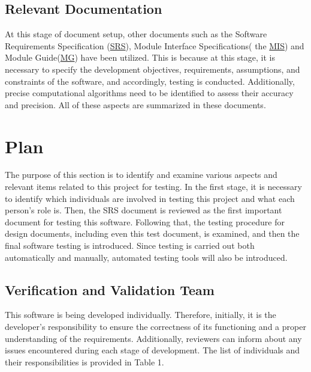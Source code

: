 \documentclass[12pt, titlepage]{article}
\begin{document}
\subsection{Relevant Documentation}

At this stage of document setup, other documents such as the Software Requirements Specification (\href{https://github.com/AtiyehSayadi/Centrality-In-Graphs/blob/main/docs/SRS/SRS.pdf}{SRS}), Module Interface Specifications( the \href{https://github.com/AtiyehSayadi/Centrality-In-Graphs/blob/main/docs/Design/SoftDetailedDes/MIS.pdf}{MIS}) and Module Guide(\href{https://github.com/AtiyehSayadi/Centrality-In-Graphs/blob/main/docs/Design/SoftArchitecture/MG.pdf}{MG}) have been utilized. This is because at this stage, it is necessary to specify the development objectives, requirements, assumptions, and constraints of the software, and accordingly, testing is conducted. Additionally, precise computational algorithms need to be identified to assess their accuracy and precision. All of these aspects are summarized in these documents.


\section{Plan}
The purpose of this section is to identify and examine various aspects and relevant items related to this project for testing. In the first stage, it is necessary to identify which individuals are involved in testing this project and what each person's role is. Then, the SRS document is reviewed as the first important document for testing this software. Following that, the testing procedure for design documents, including even this test document, is examined, and then the final software testing is introduced. Since testing is carried out both automatically and manually, automated testing tools will also be introduced.

\subsection{Verification and Validation Team}

This software is being developed individually. Therefore, initially, it is the developer's responsibility to ensure the correctness of its functioning and a proper understanding of the requirements. Additionally, reviewers can inform about any issues encountered during each stage of development. The list of individuals and their responsibilities is provided in Table 1.
\end{document}
